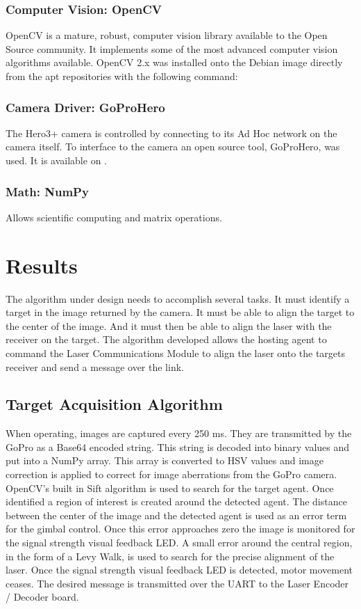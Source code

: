 \documentclass[botnum, fleqn]{unmeethesis}
\begin{document}
\subsubsection{Computer Vision: OpenCV}
OpenCV is a mature, robust, computer vision library available to the Open Source community. It implements some of the most advanced computer vision algorithms available. OpenCV 2.x was installed onto the Debian image directly from the apt repositories with the following command:
\subsubsection{Camera Driver: GoProHero}
The Hero3+ camera is controlled by connecting to its Ad Hoc network on the camera itself. To interface to the camera an open source tool, GoProHero, was used. It is available on \cite{goprohero}.
\subsubsection{Math: NumPy}
Allows scientific computing and matrix operations.

\section*{Results}

The algorithm under design needs to accomplish several tasks. It must identify a target in the image returned by the camera. It must be able to align the target to the center of the image. And it must then be able to align the laser with the receiver on the target. The algorithm developed allows the hosting agent to command the Laser Communications Module to align the laser onto the targets receiver and send a message over the link.

\subsection*{Target Acquisition Algorithm}

When operating, images are captured every 250 ms. They are transmitted by the GoPro as a Base64 encoded string. This string is decoded into binary values and put into a NumPy array. This array is converted to HSV values and image correction is applied to correct for image aberrations from the GoPro camera. OpenCV's built in Sift algorithm is used to search for the target agent. Once identified a region of interest is created around the detected agent. The distance between the center of the image and the detected agent is used as an error term for the gimbal control. Once this error approaches zero the image is monitored for the signal strength visual feedback LED. A small error around the central region, in the form of a Levy Walk, is used to search for the precise alignment of the laser. Once the signal strength visual feedback LED is detected, motor movement ceases. The desired message is transmitted over the UART to the Laser Encoder / Decoder board. 
\end{document}
